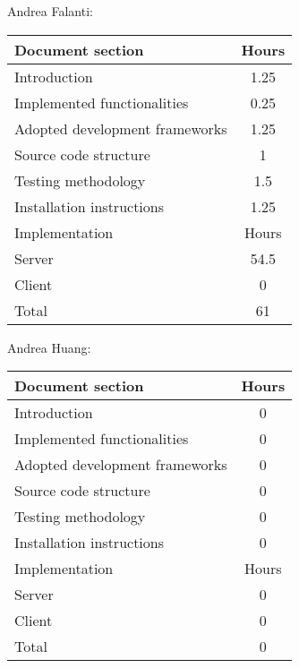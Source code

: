 Andrea Falanti:

\begin{tabular}{|l|c|}
    \hline
    Document section & Hours\\
    \hline
     Introduction & 1.25\\
     Implemented functionalities & 0.25\\
     Adopted development frameworks & 1.25\\
     Source code structure & 1\\
     Testing methodology & 1.5\\
     Installation instructions & 1.25\\
     \hline
     Implementation & Hours \\
     \hline
     Server & 54.5\\
     Client & 0\\
     \hline
     Total & 61\\
     \hline
\end{tabular}

\vskip 0.3in

Andrea Huang:

\begin{tabular}{|l|c|}
    \hline
    Document section & Hours \\
    \hline
     Introduction & 0\\
     Implemented functionalities & 0\\
     Adopted development frameworks & 0\\
     Source code structure & 0\\
     Testing methodology & 0\\
     Installation instructions & 0\\
     \hline
     Implementation & Hours \\
     \hline
     Server & 0\\
     Client & 0\\
     \hline
     Total & 0\\
     \hline
\end{tabular}